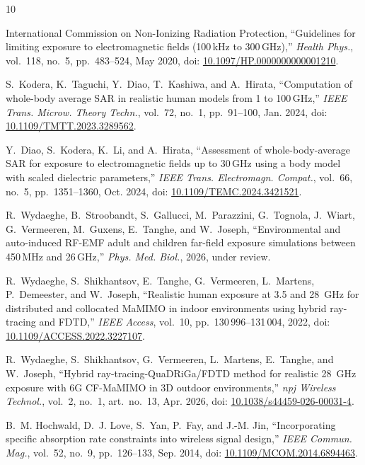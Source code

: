 \documentclass[journal,twocolumn,10pt]{IEEEtran}
\newcommand*{\doi}[1]{\href{https://doi.org/#1}{#1}}
\theoremstyle{plain}
\theoremstyle{remark}
\begin{document}
\begin{thebibliography}{10}
\providecommand{\url}[1]{#1}

International Commission on Non-Ionizing Radiation Protection,
  ``Guidelines for limiting exposure to electromagnetic fields
  (100\,kHz to 300\,GHz),'' \emph{Health Phys.}, vol.~118, no.~5,
  pp.~483--524, May 2020, doi: \doi{10.1097/HP.0000000000001210}.

S.~Kodera, K.~Taguchi, Y.~Diao, T.~Kashiwa, and A.~Hirata,
  ``Computation of whole-body average SAR in realistic human models from
  1 to 100\,GHz,'' \emph{IEEE Trans. Microw. Theory Techn.}, vol.~72,
  no.~1, pp.~91--100, Jan. 2024, doi: \doi{10.1109/TMTT.2023.3289562}.

Y.~Diao, S.~Kodera, K.~Li, and A.~Hirata, ``Assessment of
  whole-body-average SAR for exposure to electromagnetic fields up to
  30\,GHz using a body model with scaled dielectric parameters,''
  \emph{IEEE Trans. Electromagn. Compat.}, vol.~66, no.~5,
  pp.~1351--1360, Oct. 2024, doi: \doi{10.1109/TEMC.2024.3421521}.

R.~Wydaeghe, B.~Stroobandt, S.~Gallucci, M.~Parazzini, G.~Tognola,
  J.~Wiart, G.~Vermeeren, M.~Guxens, E.~Tanghe, and W.~Joseph,
  ``Environmental and auto-induced RF-EMF adult and children far-field
  exposure simulations between 450\,MHz and 26\,GHz,''
  \emph{Phys. Med. Biol.}, 2026, under review.

R.~Wydaeghe, S.~Shikhantsov, E.~Tanghe, G.~Vermeeren, L.~Martens,
  P.~Demeester, and W.~Joseph, ``Realistic human exposure at
  3.5 and 28~GHz for distributed and collocated MaMIMO in indoor
  environments using hybrid ray-tracing and FDTD,'' \emph{IEEE
  Access}, vol.~10, pp.~130\,996--131\,004, 2022, doi:
  \doi{10.1109/ACCESS.2022.3227107}.

R.~Wydaeghe, S.~Shikhantsov, G.~Vermeeren, L.~Martens, E.~Tanghe,
  and W.~Joseph, ``Hybrid ray-tracing-QuaDRiGa/FDTD method for
  realistic 28~GHz exposure with 6G CF-MaMIMO in 3D outdoor
  environments,'' \emph{npj Wireless Technol.}, vol.~2, no.~1,
  art.~no.~13, Apr. 2026, doi: \doi{10.1038/s44459-026-00031-4}.

B.~M. Hochwald, D.~J. Love, S.~Yan, P.~Fay, and J.-M. Jin,
  ``Incorporating specific absorption rate constraints into wireless
  signal design,'' \emph{IEEE Commun. Mag.}, vol.~52, no.~9,
  pp.~126--133, Sep. 2014, doi: \doi{10.1109/MCOM.2014.6894463}.


\end{thebibliography}
\end{document}
